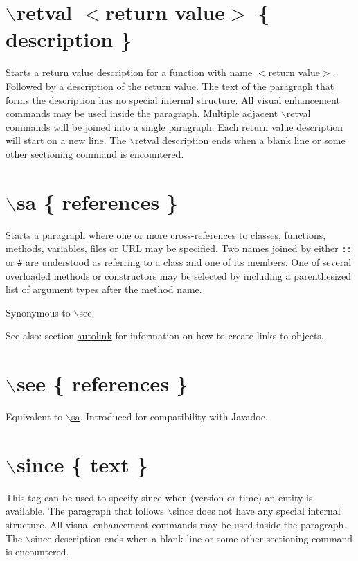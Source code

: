  \hypertarget{commands_cmdretval}{}\section{$\backslash$retval $<$return value$>$ \{ description \}}\label{commands_cmdretval}
 Starts a return value description for a function with name $<$return value$>$. Followed by a description of the return value. The text of the paragraph that forms the description has no special internal structure. All visual enhancement commands may be used inside the paragraph. Multiple adjacent $\backslash$retval commands will be joined into a single paragraph. Each return value description will start on a new line. The $\backslash$retval description ends when a blank line or some other sectioning command is encountered.



 \hypertarget{commands_cmdsa}{}\section{$\backslash$sa \{ references \}}\label{commands_cmdsa}
 Starts a paragraph where one or more cross-references to classes, functions, methods, variables, files or URL may be specified. Two names joined by either {\tt ::} or {\tt \#} are understood as referring to a class and one of its members. One of several overloaded methods or constructors may be selected by including a parenthesized list of argument types after the method name.

Synonymous to $\backslash$see.

\begin{Desc}
\item[See also:]section \hyperlink{autolink}{autolink} for information on how to create links to objects.\end{Desc}


 \hypertarget{commands_cmdsee}{}\section{$\backslash$see \{ references \}}\label{commands_cmdsee}
 Equivalent to \hyperlink{commands_cmdsa}{$\backslash$sa}. Introduced for compatibility with Javadoc.



 \hypertarget{commands_cmdsince}{}\section{$\backslash$since \{ text \}}\label{commands_cmdsince}
 This tag can be used to specify since when (version or time) an entity is available. The paragraph that follows $\backslash$since does not have any special internal structure. All visual enhancement commands may be used inside the paragraph. The $\backslash$since description ends when a blank line or some other sectioning command is encountered.



